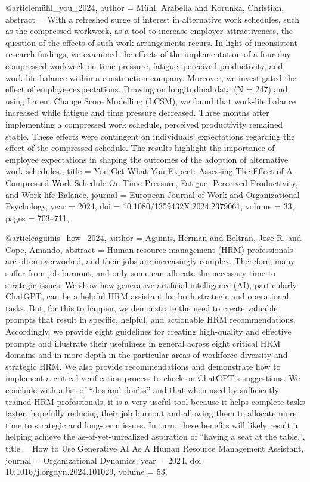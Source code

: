 @article{mühl_you_2024,
  author = {Mühl, Arabella and Korunka, Christian},
  abstract = {With a refreshed surge of interest in alternative work schedules, such as the compressed workweek, as a tool to increase employer attractiveness, the question of the effects of such work arrangements recurs. In light of inconsistent research findings, we examined the effects of the implementation of a four-day compressed workweek on time pressure, fatigue, perceived productivity, and work-life balance within a construction company. Moreover, we investigated the effect of employee expectations. Drawing on longitudinal data (N = 247) and using Latent Change Score Modelling (LCSM), we found that work-life balance increased while fatigue and time pressure decreased. Three months after implementing a compressed work schedule, perceived productivity remained stable. These effects were contingent on individuals’ expectations regarding the effect of the compressed schedule. The results highlight the importance of employee expectations in shaping the outcomes of the adoption of alternative work schedules.},
  title = {{You} {Get} {What} {You} {Expect}: {Assessing} {The} {Effect} {of} {A} {Compressed} {Work} {Schedule} {On} {Time} {Pressure}, {Fatigue}, {Perceived} {Productivity}, {and} {Work-life} {Balance}},
  journal = {European Journal of Work and Organizational Psychology},
  year = {2024},
  doi = {10.1080/1359432X.2024.2379061},
  volume = {33},
  pages = {703--711},
}

@article{aguinis_how_2024,
  author = {Aguinis, Herman and Beltran, Jose R. and Cope, Amando},
  abstract = {Human resource management (HRM) professionals are often overworked, and their jobs are increasingly complex. Therefore, many suffer from job burnout, and only some can allocate the necessary time to strategic issues. We show how generative artificial intelligence (AI), particularly ChatGPT, can be a helpful HRM assistant for both strategic and operational tasks. But, for this to happen, we demonstrate the need to create valuable prompts that result in specific, helpful, and actionable HRM recommendations. Accordingly, we provide eight guidelines for creating high-quality and effective prompts and illustrate their usefulness in general across eight critical HRM domains and in more depth in the particular areas of workforce diversity and strategic HRM. We also provide recommendations and demonstrate how to implement a critical verification process to check on ChatGPT's suggestions. We conclude with a list of “dos and don'ts” and that when used by sufficiently trained HRM professionals, it is a very useful tool because it helps complete tasks faster, hopefully reducing their job burnout and allowing them to allocate more time to strategic and long-term issues. In turn, these benefits will likely result in helping achieve the as-of-yet-unrealized aspiration of “having a seat at the table.”},
  title = {{How} {to} {Use} {Generative} {AI} {As} {A} {Human} {Resource} {Management} {Assistant}},
  journal = {Organizational Dynamics},
  year = {2024},
  doi = {10.1016/j.orgdyn.2024.101029},
  volume = {53},
}

